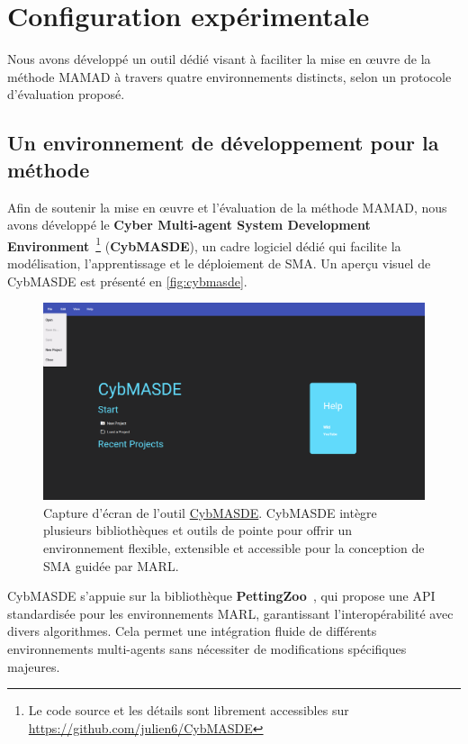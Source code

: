 \documentclass[pdflatex,sn-mathphys-num]{sn-jnl}%
\theoremstyle{thmstyleone}%
\theoremstyle{thmstyletwo}%
\theoremstyle{thmstylethree}%
\begin{document}
\section{Configuration expérimentale}
\label{sec:experimental_setup}

Nous avons développé un outil dédié visant à faciliter la mise en œuvre de la méthode MAMAD à travers quatre environnements distincts, selon un protocole d'évaluation proposé.


\subsection{Un environnement de développement pour la méthode}

Afin de soutenir la mise en œuvre et l'évaluation de la méthode MAMAD, nous avons développé le \textbf{Cyber Multi-agent System Development Environment}~\footnote{Le code source et les détails sont librement accessibles sur \url{https://github.com/julien6/CybMASDE}} (\textbf{CybMASDE}), un cadre logiciel dédié qui facilite la modélisation, l'apprentissage et le déploiement de SMA. Un aperçu visuel de CybMASDE est présenté en \autoref{fig:cybmasde}.

\begin{figure}[h!]
    \centering
    \includegraphics[width=0.7\linewidth]{figures/CybMASDE.png}
    \caption{Capture d'écran de l'outil \href{https://github.com/julien6/CybMASDE}{CybMASDE}. CybMASDE intègre plusieurs bibliothèques et outils de pointe pour offrir un environnement flexible, extensible et accessible pour la conception de SMA guidée par MARL.}
    \label{fig:cybmasde}
\end{figure}

CybMASDE s'appuie sur la bibliothèque \textbf{PettingZoo}~\cite{Terry2021}, qui propose une API standardisée pour les environnements MARL, garantissant l'interopérabilité avec divers algorithmes. Cela permet une intégration fluide de différents environnements multi-agents sans nécessiter de modifications spécifiques majeures.
\end{document}
